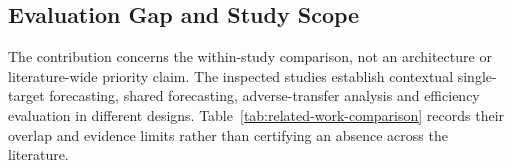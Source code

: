 \documentclass[5p,twocolumn]{elsarticle}
\begin{document}
\subsection{Evaluation Gap and Study Scope}
\label{sec:rw-gap}

The contribution concerns the within-study comparison, not an architecture
or literature-wide priority claim. The inspected studies establish contextual
single-target forecasting, shared forecasting, adverse-transfer analysis and
efficiency evaluation in different designs. Table~\ref{tab:related-work-comparison}
records their overlap and evidence limits rather than certifying an absence
across the literature.

\end{document}
